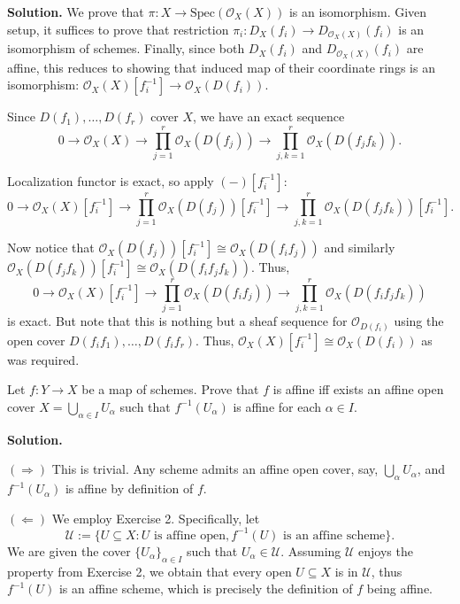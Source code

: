 \documentclass{template}
\begin{document}
\textbf{Solution.} We prove that $\pi: X \to \text{Spec}(\mathcal{O}_X(X))$ is
an isomorphism. Given setup, it suffices to prove that restriction $\pi_i:
D_X(f_i) \to D_{\mathcal{O}_X(X)}(f_i)$ is an isomorphism of schemes. Finally,
since both $D_X(f_i)$ and $D_{\mathcal{O}_X(X)}(f_i)$ are affine, this reduces
to showing that induced map of their coordinate rings is an isomorphism:
$\mathcal{O}_X(X)[f_i^{-1}] \to \mathcal{O}_X(D(f_i))$.

Since $D(f_1),\dots,D(f_r)$ cover $X$, we have an exact sequence
\begin{equation*}
    0 \to \mathcal{O}_X(X) \to \prod_{j=1}^r \mathcal{O}_X(D(f_j)) \to \prod_{j,k=1}^r \mathcal{O}_X(D(f_jf_k)).
\end{equation*}

Localization functor is exact, so apply $(-)[f_i^{-1}]$:
\begin{equation*}
    0 \to \mathcal{O}_X(X)[f_i^{-1}] \to \prod_{j=1}^r \mathcal{O}_X(D(f_j))[f_i^{-1}] \to \prod_{j,k=1}^r \mathcal{O}_X(D(f_jf_k))[f_i^{-1}].
\end{equation*}

Now notice that $\mathcal{O}_X(D(f_j))[f_i^{-1}] \cong \mathcal{O}_X(D(f_if_j))$
and similarly $\mathcal{O}_X(D(f_jf_k))[f_i^{-1}] \cong \mathcal{O}_X(D(f_if_jf_k))$. Thus,
\begin{equation*}
    0 \to \mathcal{O}_X(X)[f_i^{-1}] \to \prod_{j=1}^r \mathcal{O}_X(D(f_if_j)) \to \prod_{j,k=1}^r \mathcal{O}_X(D(f_if_jf_k))
\end{equation*}
is exact. But note that this is nothing but a sheaf sequence for $\mathcal{O}_{D(f_i)}$
using the open cover $D(f_if_1),\dots,D(f_if_r)$. Thus, $\mathcal{O}_X(X)[f_i^{-1}] \cong \mathcal{O}_X(D(f_i))$
as was required.

\begin{problem}[Exercise 4]
    Let $f: Y \to X$ be a map of schemes. Prove that $f$ is affine iff 
    exists an affine open cover $X = \bigcup_{\alpha \in I}U_{\alpha}$ such that 
    $f^{-1}(U_{\alpha})$ is affine for each $\alpha \in I$.
\end{problem}

\textbf{Solution.}

$(\Rightarrow)$ This is trivial. Any scheme admits an affine open cover, 
say, $\bigcup_{\alpha}U_{\alpha}$, and $f^{-1}(U_{\alpha})$ is affine 
by definition of $f$. 

$(\Leftarrow)$ We employ Exercise 2. Specifically, let
\begin{equation*}
    \mathcal{U} := \{U \subseteq X: \text{$U$ is affine open}, \text{$f^{-1}(U)$ is an affine scheme}\}.
\end{equation*}
We are given the cover $\{U_{\alpha}\}_{\alpha \in I}$ such that $U_{\alpha} \in \mathcal{U}$.
Assuming $\mathcal{U}$ enjoys the property from Exercise 2, we obtain that 
every open $U \subseteq X$ is in $\mathcal{U}$, thus $f^{-1}(U)$ is an affine scheme, 
which is precisely the definition of $f$ being affine.
\end{document}
